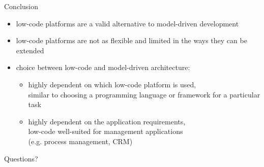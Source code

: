 \documentclass[aspectratio=169]{beamer}
\begin{document}
  \begin{frame}{Conclusion}
    \begin{itemize}
      \item low-code platforms are a valid alternative to model-driven development
      \item low-code platforms are not as flexible and limited in the ways they can be extended
      \item choice between low-code and model-driven architecture:
        \begin{itemize}
          \item highly dependent on which low-code platform is used, \\
                similar to choosing a programming language or framework for a particular task
          \item highly dependent on the application requirements, \\
                low-code well-suited for management applications \\
                (e.g. process management, CRM)
        \end{itemize}
    \end{itemize}
  \end{frame}


  \begin{frame}[standout]
    Questions?
  \end{frame}
\end{document}

